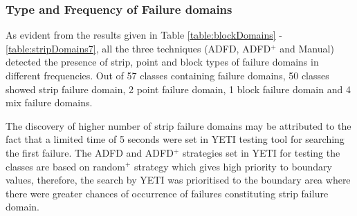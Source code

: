 







\subsubsection{Type and Frequency of Failure domains}
As evident from the results given in Table \ref{table:blockDomains} - \ref{table:stripDomains7}, all the three techniques (ADFD, ADFD$^+$ and Manual) detected the presence of strip, point and block types of failure domains in different frequencies. Out of 57 classes containing failure domains, 50 classes showed strip failure domain, 2 point failure domain, 1 block failure domain and 4 mix failure domains.  

The discovery of higher number of strip failure domains may be attributed to the fact that a limited time of 5 seconds were set in YETI testing tool for searching the first failure. The ADFD and ADFD$^+$ strategies set in YETI for testing the classes are based on random$^+$ strategy which gives high priority to boundary values, therefore, the search by YETI was prioritised to the boundary area where there were greater chances of occurrence of failures constituting strip failure domain.

